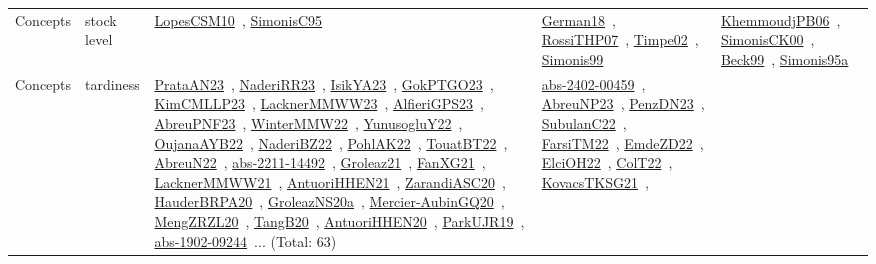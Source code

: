 {\begin{longtable}{lp{3cm}>{\raggedright\arraybackslash}p{6cm}>{\raggedright\arraybackslash}p{6cm}>{\raggedright\arraybackslash}p{8cm}}
Concepts & stock level & \href{../works/LopesCSM10.pdf}{LopesCSM10}~\cite{LopesCSM10}, \href{../works/SimonisC95.pdf}{SimonisC95}~\cite{SimonisC95} & \href{../works/German18.pdf}{German18}~\cite{German18}, \href{../works/RossiTHP07.pdf}{RossiTHP07}~\cite{RossiTHP07}, \href{../works/Timpe02.pdf}{Timpe02}~\cite{Timpe02}, \href{../works/Simonis99.pdf}{Simonis99}~\cite{Simonis99} & \href{../works/KhemmoudjPB06.pdf}{KhemmoudjPB06}~\cite{KhemmoudjPB06}, \href{../works/SimonisCK00.pdf}{SimonisCK00}~\cite{SimonisCK00}, \href{../works/Beck99.pdf}{Beck99}~\cite{Beck99}, \href{../works/Simonis95a.pdf}{Simonis95a}~\cite{Simonis95a}\\
Concepts & tardiness & \href{../works/PrataAN23.pdf}{PrataAN23}~\cite{PrataAN23}, \href{../works/NaderiRR23.pdf}{NaderiRR23}~\cite{NaderiRR23}, \href{../works/IsikYA23.pdf}{IsikYA23}~\cite{IsikYA23}, \href{../works/GokPTGO23.pdf}{GokPTGO23}~\cite{GokPTGO23}, \href{../works/KimCMLLP23.pdf}{KimCMLLP23}~\cite{KimCMLLP23}, \href{../works/LacknerMMWW23.pdf}{LacknerMMWW23}~\cite{LacknerMMWW23}, \href{../works/AlfieriGPS23.pdf}{AlfieriGPS23}~\cite{AlfieriGPS23}, \href{../works/AbreuPNF23.pdf}{AbreuPNF23}~\cite{AbreuPNF23}, \href{../works/WinterMMW22.pdf}{WinterMMW22}~\cite{WinterMMW22}, \href{../works/YunusogluY22.pdf}{YunusogluY22}~\cite{YunusogluY22}, \href{../works/OujanaAYB22.pdf}{OujanaAYB22}~\cite{OujanaAYB22}, \href{../works/NaderiBZ22.pdf}{NaderiBZ22}~\cite{NaderiBZ22}, \href{../works/PohlAK22.pdf}{PohlAK22}~\cite{PohlAK22}, \href{../works/TouatBT22.pdf}{TouatBT22}~\cite{TouatBT22}, \href{../works/AbreuN22.pdf}{AbreuN22}~\cite{AbreuN22}, \href{../works/abs-2211-14492.pdf}{abs-2211-14492}~\cite{abs-2211-14492}, \href{../works/Groleaz21.pdf}{Groleaz21}~\cite{Groleaz21}, \href{../works/FanXG21.pdf}{FanXG21}~\cite{FanXG21}, \href{../works/LacknerMMWW21.pdf}{LacknerMMWW21}~\cite{LacknerMMWW21}, \href{../works/AntuoriHHEN21.pdf}{AntuoriHHEN21}~\cite{AntuoriHHEN21}, \href{../works/ZarandiASC20.pdf}{ZarandiASC20}~\cite{ZarandiASC20}, \href{../works/HauderBRPA20.pdf}{HauderBRPA20}~\cite{HauderBRPA20}, \href{../works/GroleazNS20a.pdf}{GroleazNS20a}~\cite{GroleazNS20a}, \href{../works/Mercier-AubinGQ20.pdf}{Mercier-AubinGQ20}~\cite{Mercier-AubinGQ20}, \href{../works/MengZRZL20.pdf}{MengZRZL20}~\cite{MengZRZL20}, \href{../works/TangB20.pdf}{TangB20}~\cite{TangB20}, \href{../works/AntuoriHHEN20.pdf}{AntuoriHHEN20}~\cite{AntuoriHHEN20}, \href{../works/ParkUJR19.pdf}{ParkUJR19}~\cite{ParkUJR19}, \href{../works/abs-1902-09244.pdf}{abs-1902-09244}~\cite{abs-1902-09244}... (Total: 63) & \href{../works/abs-2402-00459.pdf}{abs-2402-00459}~\cite{abs-2402-00459}, \href{../works/AbreuNP23.pdf}{AbreuNP23}~\cite{AbreuNP23}, \href{../works/PenzDN23.pdf}{PenzDN23}~\cite{PenzDN23}, \href{../works/SubulanC22.pdf}{SubulanC22}~\cite{SubulanC22}, \href{../works/FarsiTM22.pdf}{FarsiTM22}~\cite{FarsiTM22}, \href{../works/EmdeZD22.pdf}{EmdeZD22}~\cite{EmdeZD22}, \href{../works/ElciOH22.pdf}{ElciOH22}~\cite{ElciOH22}, \href{../works/ColT22.pdf}{ColT22}~\cite{ColT22}, \href{../works/KovacsTKSG21.pdf}{KovacsTKSG21}~\cite{KovacsTKSG21}, 
\end{longtable}}
